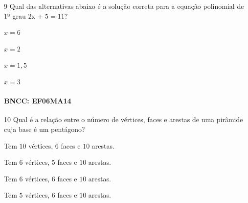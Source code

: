 
\num{9}  Qual das alternativas abaixo é a solução correta para a equação
polinomial de 1º grau $2$x + $5 = 11$?

\begin{escolha}
\item $x = 6$
\item $x = 2$
\item $x = 1,5$
\item $x = 3$
\end{escolha}

\paragraph{BNCC: EF06MA14 }


\num{10} Qual é a relação entre o número de vértices, faces e arestas de uma
pirâmide cuja base é um pentágono?

\begin{escolha}
\item Tem $10$ vértices, $6$ faces e $10$ arestas.
\item Tem $6$ vértices, $5$ faces e $10$ arestas.
\item Tem $6$ vértices, $6$ faces e $10$ arestas.
\item Tem $5$ vértices, $6$ faces e $10$ arestas.
\end{escolha}

